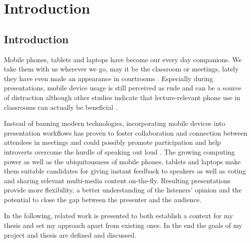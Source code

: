 \chapter{Introduction}
\label{cha:introduction}

\section{Introduction}
Mobile phones, tablets and laptops have become our every day companions. We take them with us wherever we go, may it be the classroom or meetings, lately they have even made an appearance in courtrooms \cite{Farrell:TrialByTablet}. Especially during presentations, mobile device usage is still perceived as rude and can be a source of distraction \cite{Bohmer:SmartphoneUseRude, Bajko:ComparativePerceptionSmartphoneMeeting, Kuznekoff:ImpactPhoneStudentLearning} although other studies indicate that lecture-relevant phone use in classrooms can actually be beneficial \cite{Kuznekoff:MobilePhoneClassroomTwitter}.

Instead of banning modern technologies, incorporating mobile devices into presentation workflows has proven to foster collaboration and connection between attendees in meetings \cite{Bohmer:SmartphoneUseRude} and could possibly promote participation and help introverts overcome the hurdle of speaking out loud \cite{Bry:Backstage}. The growing computing power as well as the ubiquitousness of mobile phones, tablets and laptops make them suitable candidates for giving instant feedback to speakers as well as voting and sharing relevant multi-media content on-the-fly. Resulting presentations provide more flexibility, a better understanding of the listeners' opinion and the potential to close the gap between the presenter and the audience.

In the following, related work is presented to both establish a context for my thesis and set my approach apart from existing ones. In the end the goals of my project and thesis are defined and discussed.

